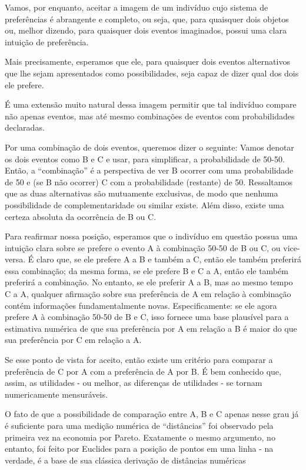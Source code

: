 \documentclass[a4paper,12pt]{article}[abntex2]
\begin{document}
Vamos, por enquanto, aceitar a imagem de um indivíduo cujo sistema de preferências é abrangente e completo, ou seja, que, para quaisquer dois objetos ou, melhor dizendo, para quaisquer dois eventos imaginados, possui uma clara intuição de preferência.

Mais precisamente, esperamos que ele, para quaisquer dois eventos alternativos que lhe sejam apresentados como possibilidades, seja capaz de dizer qual dos dois ele prefere.

É uma extensão muito natural dessa imagem permitir que tal indivíduo compare não apenas eventos, mas até mesmo combinações de eventos com probabilidades declaradas.

Por uma combinação de dois eventos, queremos dizer o seguinte: Vamos denotar os dois eventos como B e C e usar, para simplificar, a probabilidade de 50-50. Então, a “combinação” é a perspectiva de ver B ocorrer com uma probabilidade de 50 e (se B não ocorrer) C com a probabilidade (restante) de 50. Ressaltamos que as duas alternativas são mutuamente exclusivas, de modo que nenhuma possibilidade de complementaridade ou similar existe. Além disso, existe uma certeza absoluta da ocorrência de B ou C.

Para reafirmar nossa posição, esperamos que o indivíduo em questão possua uma intuição clara sobre se prefere o evento A à combinação 50-50 de B ou C, ou vice-versa. É claro que, se ele prefere A a B e também a C, então ele também preferirá essa combinação; da mesma forma, se ele prefere B e C a A, então ele também preferirá a combinação. No entanto, se ele preferir A a B, mas ao mesmo tempo C a A, qualquer afirmação sobre sua preferência de A em relação à combinação contém informações fundamentalmente novas. Especificamente: se ele agora prefere A à combinação 50-50 de B e C, isso fornece uma base plausível para a estimativa numérica de que sua preferência por A em relação a B é maior do que sua preferência por C em relação a A.

Se esse ponto de vista for aceito, então existe um critério para comparar a preferência de C por A com a preferência de A por B. É bem conhecido que, assim, as utilidades - ou melhor, as diferenças de utilidades - se tornam numericamente mensuráveis.

O fato de que a possibilidade de comparação entre A, B e C apenas nesse grau já é suficiente para uma medição numérica de “distâncias” foi observado pela primeira vez na economia por Pareto. Exatamente o mesmo argumento, no entanto, foi feito por Euclides para a posição de pontos em uma linha - na verdade, é a base de sua clássica derivação de distâncias numéricas
\end{document}
